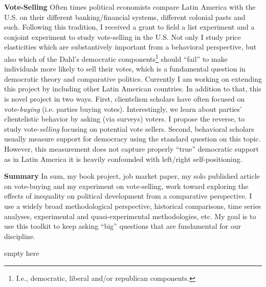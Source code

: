 \documentclass[11pt]{letter} %
\begin{document}
\begin{letter}{}
{\bf Vote-Selling} Often times political economists compare Latin America with the U.S. on their different banking/financial systems, different colonial pasts and such. Following this tradition, I received a grant to field a list experiment and a conjoint experiment to study vote-selling in the U.S. Not only I study price elasticities which are substantively important from a behavioral perspective, but also which of the Dahl's democratic components\footnote{I.e., democratic, liberal and/or republican components.} should ``fail'' to make individuals more likely to sell their votes, which is a fundamental question in democratic theory and comparative politics. Currently I am working on extending this project by including other Latin American countries. In addition to that, this is novel project in two ways. First, clientelism scholars have often focused on vote-\emph{buying} (i.e. parties buying votes). Interestingly, we learn about parties' clientelistic behavior by asking (via surveys) voters. I propose the reverse, to study vote-\emph{selling} focusing on potential vote sellers. Second, behavioral scholars usually measure support for democracy using the standard question on this topic. However, this measurement does not capture properly ``true'' democratic support as in Latin America it is heavily confounded with left/right self-positioning. 

{\bf Summary} In sum, my book project, job market paper, my solo published article on vote-buying and my experiment on vote-selling, work toward exploring the effects of inequality on political development from a comparative perspective. I use a widely broad methodological perspective, historical comparisons, time series analyses, experimental and quasi-experimental methodologies, etc. My goal is to use this toolkit to keep asking ``big'' questions that are fundamental for our discipline.

\closing{{\color{white}empty here}}




\end{letter}
\end{document}
